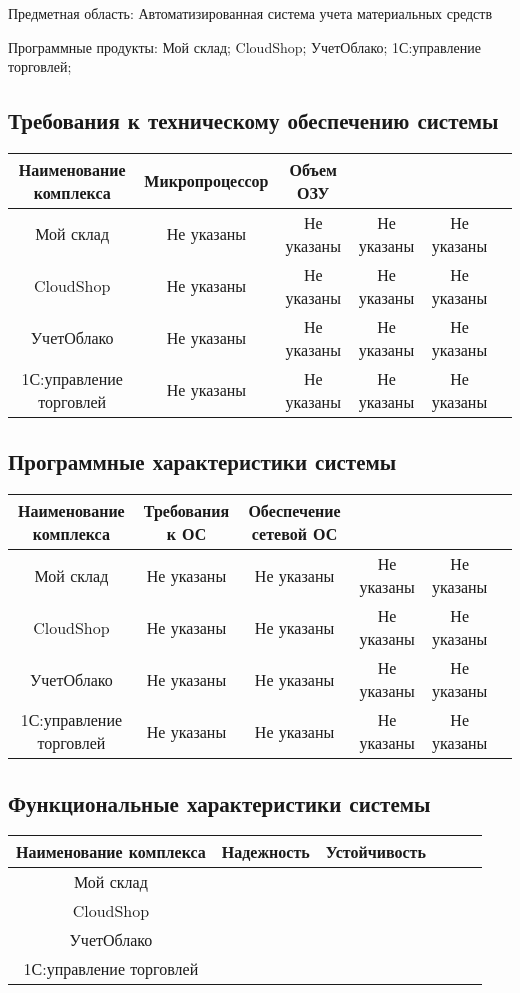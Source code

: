 \documentclass[14pt]{extarticle}
\begin{document}
Предметная область: Автоматизированная система учета материальных средств

Программные продукты: Мой склад; CloudShop; УчетОблако; 1С:управление торговлей;

\subsection{Требования к техническому обеспечению системы}

\begin{tabular}{|c|c|c|c|c|c|}
	\hline
	Наименование комплекса & Микропроцессор & Объем ОЗУ & & & \\ \hline
	Мой склад & Не указаны & Не указаны & Не указаны & Не указаны & \\ \hline
	CloudShop & Не указаны & Не указаны & Не указаны & Не указаны & \\ \hline
	УчетОблако & Не указаны & Не указаны & Не указаны & Не указаны & \\ \hline
	1С:управление торговлей & Не указаны & Не указаны & Не указаны & Не указаны & \\ \hline
\end{tabular}

\subsection{Программные  характеристики системы}

\begin{tabular}{|c|c|c|c|c|c|}
	\hline
	Наименование комплекса & Требования к ОС & Обеспечение сетевой ОС &  & & \\ \hline
	Мой склад & Не указаны & Не указаны & Не указаны & Не указаны & \\ \hline
	CloudShop & Не указаны & Не указаны & Не указаны & Не указаны & \\ \hline
	УчетОблако & Не указаны & Не указаны & Не указаны & Не указаны & \\ \hline
	1С:управление торговлей & Не указаны & Не указаны & Не указаны & Не указаны & \\ \hline
\end{tabular}

\subsection{Функциональные  характеристики системы}

\begin{tabular}{|c|c|c|c|c|c|}
	\hline
	Наименование комплекса & Надежность & Устойчивость &  & & \\ \hline
	Мой склад &  &  &  & & \\ \hline
	CloudShop &  &  &  & & \\ \hline
	УчетОблако &  &  &  & & \\ \hline
	1С:управление торговлей &  &  &  & & \\ \hline
\end{tabular}
\end{document}
